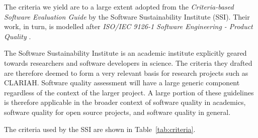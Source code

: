 \documentclass[a4paper,11pt]{article}
\begin{document}
The criteria we yield are  to a large extent adopted from the
\emph{Criteria-based Software Evaluation Guide} \citep{SSIGUIDE} by the Software
Sustainability Institute (SSI). Their work, in turn, is modelled after
\emph{ISO/IEC 9126-1 Software Engineering - Product Quality} \citep{ISO9126}.
%
%
%

The Software Sustainability Institute\citep{SSIGENERAL} is an academic institute
explicitly geared towards researchers and software developers in science. The
criteria they drafted are therefore deemed to form a very relevant basis for
research projects such as CLARIAH. Software quality assessment will have a
large generic component regardless of the context of the larger project. A
large portion of these guidelines is therefore applicable in the broader context
of software quality in academics, software quality for open source projects, and
software quality in general.

The criteria used by the SSI are shown in Table~\ref{tab:criteria}.
\end{document}
